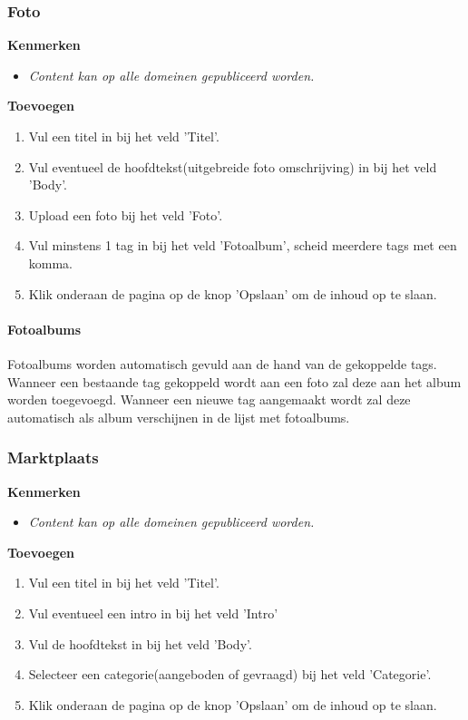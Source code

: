 \subsubsection{Foto}\label{foto}

\textbf{Kenmerken}

\begin{itemize}
\item \emph{Content kan op alle domeinen gepubliceerd worden.}
\end{itemize}

\textbf{Toevoegen}

\begin{enumerate}
\item Vul een titel in bij het veld 'Titel'.
\item Vul eventueel de hoofdtekst(uitgebreide foto omschrijving) in bij het veld 'Body'.
\item Upload een foto bij het veld 'Foto'.
\item Vul minstens 1 tag in bij het veld 'Fotoalbum', scheid meerdere tags met een komma.
\item Klik onderaan de pagina op de knop 'Opslaan' om de inhoud op te slaan.
\end{enumerate}

\paragraph{Fotoalbums}
Fotoalbums worden automatisch gevuld aan de hand van de gekoppelde tags. Wanneer een bestaande tag gekoppeld wordt aan een foto zal deze aan het album worden toegevoegd. Wanneer een nieuwe tag aangemaakt wordt zal deze automatisch als album verschijnen in de lijst met fotoalbums.

\subsubsection{Marktplaats}\label{marktplaats}

\textbf{Kenmerken}

\begin{itemize}
\item \emph{Content kan op alle domeinen gepubliceerd worden.}
\end{itemize}

\textbf{Toevoegen}

\begin{enumerate}
\item Vul een titel in bij het veld 'Titel'.
\item Vul eventueel een intro in bij het veld 'Intro'
\item Vul de hoofdtekst in bij het veld 'Body'.
\item Selecteer een categorie(aangeboden of gevraagd) bij het veld 'Categorie'.
\item Klik onderaan de pagina op de knop 'Opslaan' om de inhoud op te slaan.
\end{enumerate}

